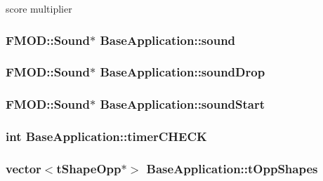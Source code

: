 score multiplier \hypertarget{class_base_application_aea4ddf4bf2fe2f475e75ac1754e64b0c}{
\subsubsection[{sound}]{\setlength{\rightskip}{0pt plus 5cm}F\-M\-O\-D\-::\-Sound$\ast$ Base\-Application\-::sound\hspace{0.3cm}{\ttfamily [protected]}}}\label{class_base_application_aea4ddf4bf2fe2f475e75ac1754e64b0c}
\hypertarget{class_base_application_aab866d736fb7032813be4f0692bf40a6}{
\subsubsection[{sound\-Drop}]{\setlength{\rightskip}{0pt plus 5cm}F\-M\-O\-D\-::\-Sound$\ast$ Base\-Application\-::sound\-Drop\hspace{0.3cm}{\ttfamily [protected]}}}\label{class_base_application_aab866d736fb7032813be4f0692bf40a6}
\hypertarget{class_base_application_ac1cb587fccc3d6d0a263d484bc6829bc}{
\subsubsection[{sound\-Start}]{\setlength{\rightskip}{0pt plus 5cm}F\-M\-O\-D\-::\-Sound$\ast$ Base\-Application\-::sound\-Start\hspace{0.3cm}{\ttfamily [protected]}}}\label{class_base_application_ac1cb587fccc3d6d0a263d484bc6829bc}
\hypertarget{class_base_application_aad18724507e497250a90dd9d12d24920}{
\subsubsection[{timer\-C\-H\-E\-C\-K}]{\setlength{\rightskip}{0pt plus 5cm}int Base\-Application\-::timer\-C\-H\-E\-C\-K\hspace{0.3cm}{\ttfamily [protected]}}}\label{class_base_application_aad18724507e497250a90dd9d12d24920}
\hypertarget{class_base_application_a38ff9c55061692b43d1d56de9bf3a363}{
\subsubsection[{t\-Opp\-Shapes}]{\setlength{\rightskip}{0pt plus 5cm}vector$<${\bf t\-Shape\-Opp}$\ast$$>$ Base\-Application\-::t\-Opp\-Shapes\hspace{0.3cm}{\ttfamily [protected]}}}\label{class_base_application_a38ff9c55061692b43d1d56de9bf3a363}
